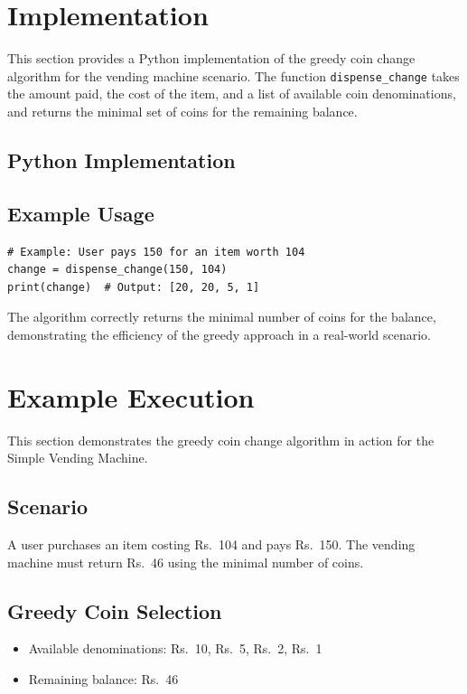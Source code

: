 \documentclass[12pt,a4paper]{report}
\begin{document}
\section{Implementation}
This section provides a Python implementation of the greedy coin change algorithm for the vending machine scenario. The function \texttt{dispense\_change} takes the amount paid, the cost of the item, and a list of available coin denominations, and returns the minimal set of coins for the remaining balance.

\subsection{Python Implementation}



\subsection{Example Usage}
\begin{verbatim}
# Example: User pays 150 for an item worth 104
change = dispense_change(150, 104)
print(change)  # Output: [20, 20, 5, 1]
\end{verbatim}
The algorithm correctly returns the minimal number of coins for the balance, demonstrating the efficiency of the greedy approach in a real-world scenario.

\section{Example Execution}
This section demonstrates the greedy coin change algorithm in action for the Simple Vending Machine.  

\subsection{Scenario}
A user purchases an item costing Rs.~104 and pays Rs.~150. The vending machine must return Rs.~46 using the minimal number of coins.  

\subsection{Greedy Coin Selection}
\begin{itemize}
    \item Available denominations: Rs.~10, Rs.~5, Rs.~2, Rs.~1
    \item Remaining balance: Rs.~46
\end{itemize}
\end{document}
